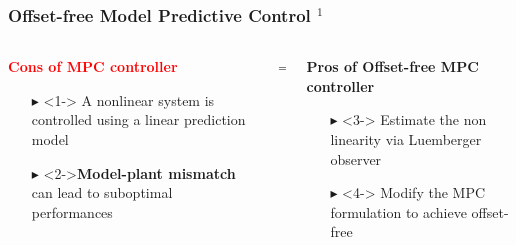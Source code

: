 \documentclass[9pt, aspectratio=169]{beamer}
\begin{document}
\begin{frame}
\frametitle{Offset-free Model Predictive Control $^1$}
\begin{columns}
\begin{column}{0.55\textwidth}
\begin{block}{}
\centering
\textcolor{red}{\textbf{Cons of MPC controller}} 
\begin{itemize}
\footnotesize
	\item[$\blacktriangleright$] <1-> A nonlinear system is controlled using a linear prediction model
	\item[$\blacktriangleright$] <2->\textbf{Model-plant mismatch} can lead to suboptimal performances
\end{itemize}
\end{block}
\end{column}
\hspace{-0.2cm}
\begin{column}{0.02\textwidth}
\centering
\vspace{0.1cm}
$\Rightarrow$
\end{column}
\hspace{-0.2cm}
\begin{column}{0.46\textwidth}
\begin{block}{}
\centering
\textcolor{mygreen}{\textbf{Pros of Offset-free MPC controller}} 
\begin{itemize}
\footnotesize
	\item[$\blacktriangleright$]<3-> Estimate the non linearity via Luemberger observer
	\item[$\blacktriangleright$]<4-> Modify the MPC formulation to achieve offset-free
\end{itemize}
\end{block}
\end{column}
\end{columns}


\end{frame}
\end{document}
